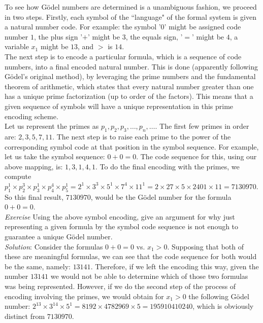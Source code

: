 To see how G\"odel numbers are determined is a unambiguous fashion, we proceed in two steps.  Firstly, each symbol of the ``language" of the formal system is given a natural number code.  For example: the symbol '0' might be assigned code number $1$, the plus sign '$+$' might be $3$, the equals sign, '$=$' might be $4$, a variable $x_{1}$ might be $13$, and $>$ is $14$.\\
The next step is to encode a particular formula, which is a sequence of code numbers, into a final encoded natural number.  This is done (apparently following G\"odel's original method), by leveraging the prime numbers and the fundamental theorem of arithmetic, which states that every natural number greater than one has a unique prime factorization (up to order of the factors).  This means that a given sequence of symbols will have a unique representation in this prime encoding scheme.\\
Let us represent the primes as $p_{1}, p_{2}, p_{3}, \ldots, p_{n}, \ldots$.  The first few primes in order are: $2,3,5,7,11$.  The next step is to raise each prime to the power of the corresponding symbol code at that position in the symbol sequence.  For example, let us take the symbol sequence: $0+0=0$.  The code sequence for this, using our above mapping, is: $1,3,1,4,1$.  To do the final encoding with the primes, we compute $p_{1}^{1} \times p_{2}^{3} \times p_{3}^{1} \times p_{4}^{4} \times p_{5}^{1}=2^{1}\times 3^{3} \times 5^{1} \times 7^{4} \times 11^{1}=2 \times 27 \times 5 \times 2401 \times 11 = 7130970$.  So this final result, $7130970$, would be the G\"odel number for the formula $0+0=0$.\\

\textit{Exercise} Using the above symbol encoding, give an argument for why just representing a given formula by the symbol code sequence is not enough to guarantee a unique G\"odel number.\\
\textit{Solution}:  Consider the formulas $0+0=0$ vs. $x_{1} > 0$.  Supposing that both of these are meaningful formulas, we can see that the code sequence for both would be the same, namely: $13141$.  Therefore, if we left the encoding this way, given the number $13141$ we would not be able to determine which of those two formulas was being represented.  However, if we do the second step of the process of encoding involving the primes, we would obtain for $x_{1} > 0$ the following G\"odel number: $2^{13} \times 3^{14} \times 5^{1} =8192 \times 4782969 \times 5 =195910410240$, which is obviously distinct from $7130970.$\\

